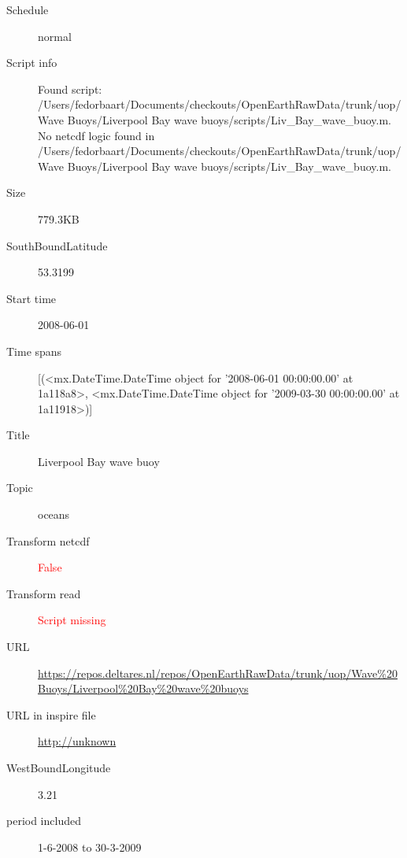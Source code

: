 \documentclass[9]{report}
\begin{document}
\begin{description}
\begin{verbatim}
\end{verbatim}
  \item[Schedule] normal
  \item[Script info] Found script: /Users/fedorbaart/Documents/checkouts/OpenEarthRawData/trunk/uop/Wave Buoys/Liverpool Bay wave buoys/scripts/Liv\_Bay\_wave\_buoy.m.
No netcdf logic found in /Users/fedorbaart/Documents/checkouts/OpenEarthRawData/trunk/uop/Wave Buoys/Liverpool Bay wave buoys/scripts/Liv\_Bay\_wave\_buoy.m.
  \item[Size] 779.3KB
  \item[SouthBoundLatitude] 53.3199
  \item[Start time] 2008-06-01
  \item[Time spans] [(<mx.DateTime.DateTime object for '2008-06-01 00:00:00.00' at 1a118a8>, <mx.DateTime.DateTime object for '2009-03-30 00:00:00.00' at 1a11918>)]
  \item[Title]  Liverpool Bay wave buoy 
  \item[Topic] oceans
  \item[Transform netcdf] \textcolor{red}{False}
  \item[Transform read] \textcolor{red}{Script missing}
  \item[URL] \href{https://repos.deltares.nl/repos/OpenEarthRawData/trunk/uop/Wave\%20Buoys/Liverpool\%20Bay\%20wave\%20buoys}{https://repos.deltares.nl/repos/OpenEarthRawData/trunk/uop/Wave\%20Buoys/Liverpool\%20Bay\%20wave\%20buoys}
  \item[URL in inspire file] \href{http://unknown}{http://unknown}
  \item[WestBoundLongitude] 3.21
  \item[period included] 1-6-2008 to 30-3-2009
\end{description}
\end{document}
